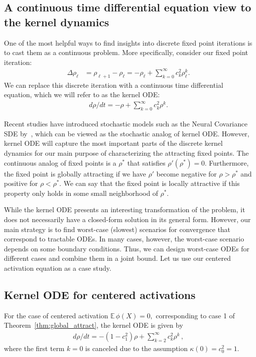 \documentclass[twoside]{article}
\newcommand{\E}{\mathbb{E}\,}
\theoremstyle{definition}
\begin{document}
\subsection{A continuous time differential equation view to the kernel dynamics} 
One of the most helpful ways to find insights into discrete fixed point iterations is to cast them as a continuous problem. More specifically, consider our fixed point iteration: 
\begin{align*}
    \Delta \rho_\ell &= \rho_{\ell+1} - \rho_\ell = - \rho_\ell + \sum_{k=0}^\infty c_k^2 \rho^k_\ell.
\end{align*}
We can replace this discrete iteration with a continuous time differential equation, which we will refer to as the kernel ODE:
\begin{align}\tag{kernel ODE}\label{eq:kernel_ODE}
    d\rho/dt = -\rho + \sum_{k=0}^\infty c_k^2 \rho^k.
\end{align}

Recent studies have introduced stochastic models such as the Neural Covariance SDE by~\citet{li2022neural}, which can be viewed as the stochastic analog of kernel ODE. However, kernel ODE will capture the most important parts of the discrete kernel dynamics for our main purpose of characterizing the attracting fixed points. The continuous analog of fixed points is a $\rho^*$ that satisfies $\rho'(\rho^*) = 0.$ Furthermore, the fixed point is globally attracting if we have $\rho'$ become negative for $\rho>\rho^*$ and positive for $\rho<\rho^*.$ We can say that the fixed point is locally attractive if this property only holds in some small neighborhood of $\rho^*.$


While the kernel ODE presents an interesting transformation of the problem, it does not necessarily have a closed-form solution in its general form. However, our main strategy is to find worst-case (slowest) scenarios for convergence that correspond to tractable ODEs. In many cases, however, the worst-case scenario depends on some boundary conditions. Thus, we can design worst-case ODEs for different cases and combine them in a joint bound. Let us use our centered activation equation as a case study. 

\subsection{Kernel ODE for centered activations}
For the case of centered activation $\E \phi(X)=0,$ corresponding to case 1 of Theorem~\ref{thm:global_attract}, the kernel ODE is given by
\begin{align*}
    d\rho/dt = -(1-c_1^2)\rho + \sum_{k=2}^\infty c_k^2\rho^k\,,
\end{align*}
where the first term $k=0$ is canceled due to the assumption $\kappa(0)=c_0^2 = 1.$ 
\end{document}
